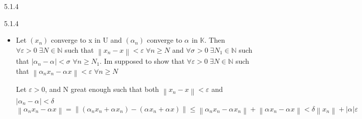 \documentclass[a4paper,norsk]{article}
\renewcommand{\geq}{\geqslant}
\renewcommand{\leq}{\leqslant}
\renewcommand{\epsilon}{\varepsilon}
\begin{document}
\begin{propositionbox}{5.1.4}{}
\begin{proofbox}{5.1.4}{}
\begin{itemize}
        We are supposed to show that $ \left( x_n + y_n \right)  $ converges to $ x+y $. Let $ \epsilon > 0 $, find $ N \in \mathbb{N} $ such that $ \forall n \geq N $, we then get that $ \left\lVert \left( x_n+y_n \right) - \left( x+y \right)  \right\rVert < \epsilon  $. 

        Observe that
        \[
            \left\lVert \left( x_n + y_n \right) - \left( x+y \right)  \right\rVert = \left\lVert \left( x_n - x \right) + \left( y_n - y \right)  \right\rVert  \leq \left\lVert x_n - x \right\rVert + \left\lVert y_n - y \right\rVert 
        \]

        Since for n greater than $ N_1 $, we get that $ \left\lVert x_n - x \right\rVert < \epsilon _1 $  and for n greater than $ N_2 $, we get that $ \left\lVert y_n - y \right\rVert < \epsilon _2 $, then we can pick $ N = max(N_1, N_2) $ and define $ \epsilon := \epsilon _1 + \epsilon _2 $ and get as a result that $ \forall n \geq N $, then

        \[
            \left\lVert \left( x_n + y_n \right) - \left( x+y \right)  \right\rVert \leq \left\lVert x_n - x \right\rVert + \left\lVert y_n - y \right\rVert < \epsilon _1 + \epsilon _2 = \epsilon.
        \]
        
        Hence, I have found an N such that for all n larger than n, then the distance between $ \left( x_n + y_n \right)  $ and $ x+y $ is less than $ \epsilon  $ away. Hence, 

        \[
            \left( x_n + y_n \right) \to x+y
        \]
        as $ n \to \infty $. 
        \item Let $ \left( x_n \right)  $ converge to x in U and $ \left( \alpha_{n}^{}  \right)  $ converge to $ \alpha_{}^{}  $ in $ \mathbb{K}  $. Then $ \forall \epsilon > 0 \; \exists  N \in \mathbb{N} $ such that $ \left\lVert x_n - x \right\rVert < \epsilon  \; \forall n \geq N$ and $ \forall \sigma _{ } > 0 \; \exists N_1 \in \mathbb{N}$ such that $ \left| \alpha_{n}^{} - \alpha_{}^{}  \right| < \sigma _{} \; \forall  n \geq N_1  $. Im supposed to show that $ \forall \epsilon > 0 \; \exists N \in \mathbb{N} $  such that $ \left\lVert \alpha_{n}^{} x_n - \alpha_{}^{} x  \right\rVert < \epsilon  \; \forall n \geq N $ 
        

        Let $ \epsilon > 0 $, and N great enough such that both $ \left\lVert x_n-x \right\rVert < \epsilon   $ and $ \left| \alpha_{n}^{} - \alpha_{}^{}  \right| < \delta  $ 
        \[
            \left\lVert \alpha_{n}^{} x_n - \alpha_{}^{} x \right\rVert = \left\lVert \left( \alpha_{n}^{} x_n + \alpha_{}^{} x_n \right) - \left( \alpha_{}^{} x_n + \alpha_{}^{} x \right)   \right\rVert  \leq  \left\lVert \alpha_{n}^{} x_n - \alpha_{}^{} x_n \right\rVert + \left\lVert \alpha_{}^{} x_n - \alpha_{}^{} x  \right\rVert < \delta \left\lVert x_n \right\rVert + \left| \alpha_{}^{}  \right| \epsilon 
        \]


\end{itemize}
\end{proofbox}
\end{propositionbox}
\end{document}
